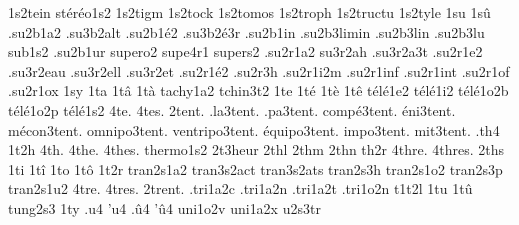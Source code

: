 {                    1s2tein
                    stéréo1s2
                    1s2tigm
                    1s2tock
                    1s2tomos
                    1s2troph
                    1s2tructu
                    1s2tyle
1su
1sû
                    .su2b1a2
                    .su3b2alt
                    .su2b1é2
                    .su3b2é3r
                    .su2b1in
                    .su2b3limin
                    .su2b3lin
                    .su2b3lu
                    sub1s2
                    .su2b1ur
                    supero2
                    supe4r1
                    supers2
                    .su2r1a2
                    su3r2ah
                    .su3r2a3t
                    .su2r1e2
                    .su3r2eau
                    .su3r2ell
                    .su3r2et
                    .su2r1é2
                    .su2r3h
                    .su2r1i2m
                    .su2r1inf
                    .su2r1int
                    .su2r1of
                    .su2r1ox
1sy
1ta
1tâ
1tà
                    tachy1a2
                    tchin3t2
1te
1té
1tè
1tê
                    télé1e2
                    télé1i2
                    télé1o2b
                    télé1o2p
                    télé1s2
4te.
4tes.
        2tent. %
     .la3tent.
     .pa3tent.
   compé3tent.
     éni3tent.
   mécon3tent.
  omnipo3tent.
ventripo3tent.
  équipo3tent.
    impo3tent.
     mit3tent.
%
.th4
1t2h
4th.
4the.
4thes.
                    thermo1s2
                    2t3heur
2thl %
2thm
2thn
th2r
4thre.
4thres.
2ths
1ti
1tî
1to
1tô
1t2r
                    tran2s1a2
                    tran3s2act
                    tran3s2ats
                    tran2s3h
                    tran2s1o2
                    tran2s3p
                    tran2s1u2
4tre.
4tres.
2trent. %
                    .tri1a2c
                    .tri1a2n
                    .tri1a2t
                    .tri1o2n
                    t1t2l
1tu
1tû
tung2s3
1ty
.u4
'u4
.û4
'û4
                    uni1o2v
                    uni1a2x
                    u2s3tr
}
